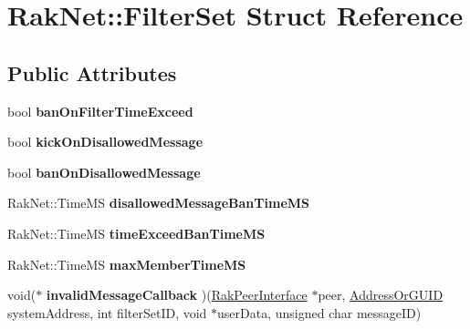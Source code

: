 \hypertarget{struct_rak_net_1_1_filter_set}{\section{Rak\-Net\-:\-:Filter\-Set Struct Reference}
\label{struct_rak_net_1_1_filter_set}
}
\subsection*{Public Attributes}
\begin{DoxyCompactItemize}
\item 
\hypertarget{struct_rak_net_1_1_filter_set_ad837b2ab9682b98a36246e5c27c22ce6}{bool {\bfseries ban\-On\-Filter\-Time\-Exceed}}\label{struct_rak_net_1_1_filter_set_ad837b2ab9682b98a36246e5c27c22ce6}

\item 
\hypertarget{struct_rak_net_1_1_filter_set_a8db454b632f30712771e77062c4c6e8e}{bool {\bfseries kick\-On\-Disallowed\-Message}}\label{struct_rak_net_1_1_filter_set_a8db454b632f30712771e77062c4c6e8e}

\item 
\hypertarget{struct_rak_net_1_1_filter_set_a8cbdd341eb8396a34073fa41061c528f}{bool {\bfseries ban\-On\-Disallowed\-Message}}\label{struct_rak_net_1_1_filter_set_a8cbdd341eb8396a34073fa41061c528f}

\item 
\hypertarget{struct_rak_net_1_1_filter_set_add846a6231b1fd17de0a2646dbba92db}{Rak\-Net\-::\-Time\-M\-S {\bfseries disallowed\-Message\-Ban\-Time\-M\-S}}\label{struct_rak_net_1_1_filter_set_add846a6231b1fd17de0a2646dbba92db}

\item 
\hypertarget{struct_rak_net_1_1_filter_set_a6c3f4944522cb5506dc1b6cb8630cf1b}{Rak\-Net\-::\-Time\-M\-S {\bfseries time\-Exceed\-Ban\-Time\-M\-S}}\label{struct_rak_net_1_1_filter_set_a6c3f4944522cb5506dc1b6cb8630cf1b}

\item 
\hypertarget{struct_rak_net_1_1_filter_set_afe67a38c629a15b61027bd1dbfca285f}{Rak\-Net\-::\-Time\-M\-S {\bfseries max\-Member\-Time\-M\-S}}\label{struct_rak_net_1_1_filter_set_afe67a38c629a15b61027bd1dbfca285f}

\item 
\hypertarget{struct_rak_net_1_1_filter_set_a8ab502ac73a29ebeb6b5260265854b89}{void($\ast$ {\bfseries invalid\-Message\-Callback} )(\hyperlink{class_rak_net_1_1_rak_peer_interface}{Rak\-Peer\-Interface} $\ast$peer, \hyperlink{struct_rak_net_1_1_address_or_g_u_i_d}{Address\-Or\-G\-U\-I\-D} system\-Address, int filter\-Set\-I\-D, void $\ast$user\-Data, unsigned char message\-I\-D)}\label{struct_rak_net_1_1_filter_set_a8ab502ac73a29ebeb6b5260265854b89}


\end{DoxyCompactItemize}
